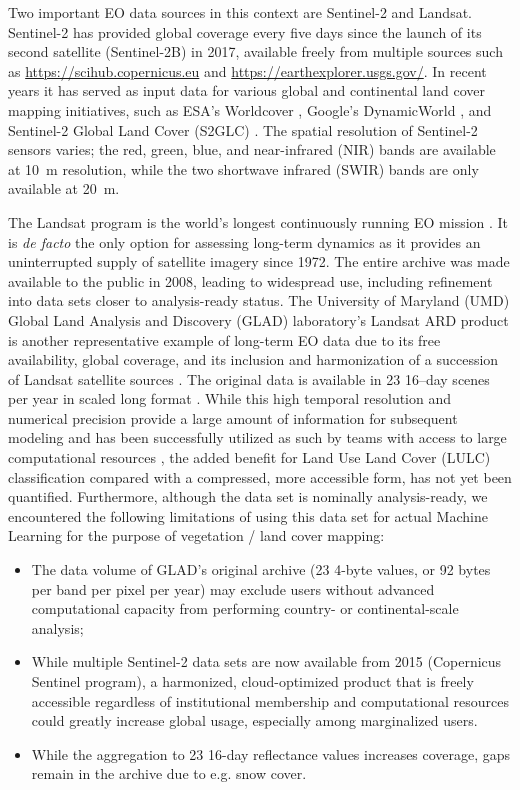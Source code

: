 Two important EO data sources in this context are Sentinel-2 and Landsat. 
Sentinel-2 has provided global coverage every five days since the launch of its second satellite (Sentinel-2B) in 2017, available freely from multiple sources such as \url{https://scihub.copernicus.eu} and \url{https://earthexplorer.usgs.gov/}. In recent years it has served as input data for various global and continental land cover mapping initiatives, such as ESA's Worldcover \citep{kerchove2021esa}, Google's DynamicWorld \citep{brown2022dynamic}, and Sentinel-2 Global Land Cover (S2GLC) \citep{malinowski2020automated}. The spatial resolution of Sentinel-2 sensors varies; the red, green, blue, and near-infrared (NIR) bands are available at 10~m resolution, while the two shortwave infrared (SWIR) bands are only available at 20~m.

The Landsat program is the world's longest continuously running EO mission \citep{wulder2022fifty}. It is \emph{de facto} the only option for assessing long-term dynamics as it provides an uninterrupted supply of satellite imagery since 1972. The entire archive was made available to the public in 2008, leading to widespread use, including refinement into data sets closer to analysis-ready status. The University of Maryland (UMD) Global Land Analysis and Discovery (GLAD) laboratory's Landsat ARD product is another representative example of long-term EO data due to its free availability, global coverage, and its inclusion and harmonization of a succession of Landsat satellite sources \citep{potapov2020landsat}. The original data is available in 23{\texttimes} 16--day scenes per year in scaled long format \citep{potapov2020landsat}. While this high temporal resolution and numerical precision provide a large amount of information for subsequent modeling and has been successfully utilized as such by teams with access to large computational resources \citep{hansen2022global}, the added benefit for Land Use Land Cover (LULC) classification compared with a compressed, more accessible form, has not yet been quantified. Furthermore, although the data set is nominally analysis-ready, we encountered the following limitations of using this data set for actual Machine Learning for the purpose of vegetation / land cover mapping:

\begin{itemize}[noitemsep]
\item The data volume of GLAD's original archive (23 4-byte values, or 92 bytes per band per pixel per year) may exclude users without advanced computational capacity from performing country- or continental-scale analysis;
\item While multiple Sentinel-2 data sets are now available from 2015 (Copernicus Sentinel program), a harmonized, cloud-optimized product that is freely accessible regardless of institutional membership and computational resources could greatly increase global usage, especially among marginalized users.
\item While the aggregation to 23 16-day reflectance values increases coverage, gaps remain in the archive due to e.g. snow cover.
\end{itemize}

